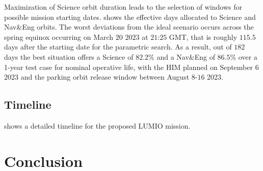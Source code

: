 Maximization of Science orbit duration leads to the selection of windows for possible mission starting dates.  shows the effective days allocated to Science and Nav\&Eng orbits. The worst deviations from the ideal scenario occurs across the spring equinox occurring on March $20$ $2023$ at $21$:$25$ GMT, that is roughly $115.5$ days after the starting date for the parametric search. As a result, out of $182$ days the best situation offers a Science of $82.2\%$ and a Nav\&Eng of $86.5\%$ over a 1-year test case for nominal operative life, with the {HIM} planned on September $6$ $2023$ and the parking orbit release window between August $8$-$16$ 2023. 

\subsection{Timeline}
 shows a detailed timeline for the proposed LUMIO mission.


\section{Conclusion}\label{sec:cncls}


